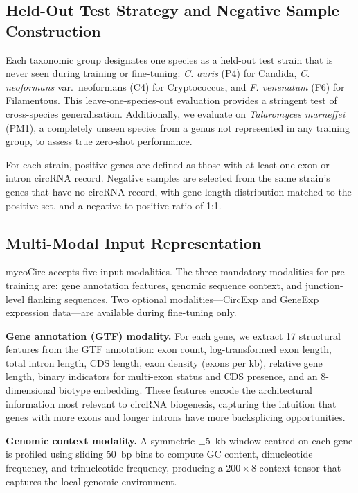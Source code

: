 \documentclass[12pt]{article}
\begin{document}
\subsection{Held-Out Test Strategy and Negative Sample Construction}

Each taxonomic group designates one species as a held-out test strain that is never seen during training or fine-tuning: \textit{C. auris} (P4) for Candida, \textit{C. neoformans} var.\ neoformans (C4) for Cryptococcus, and \textit{F. venenatum} (F6) for Filamentous. This leave-one-species-out evaluation provides a stringent test of cross-species generalisation. Additionally, we evaluate on \textit{Talaromyces marneffei} (PM1), a completely unseen species from a genus not represented in any training group, to assess true zero-shot performance.

For each strain, positive genes are defined as those with at least one exon or intron circRNA record. Negative samples are selected from the same strain's genes that have no circRNA record, with gene length distribution matched to the positive set, and a negative-to-positive ratio of 1:1.

\subsection{Multi-Modal Input Representation}

mycoCirc accepts five input modalities. The three mandatory modalities for pre-training are: gene annotation features, genomic sequence context, and junction-level flanking sequences. Two optional modalities---CircExp and GeneExp expression data---are available during fine-tuning only.

\textbf{Gene annotation (GTF) modality.} For each gene, we extract 17 structural features from the GTF annotation: exon count, log-transformed exon length, total intron length, CDS length, exon density (exons per kb), relative gene length, binary indicators for multi-exon status and CDS presence, and an 8-dimensional biotype embedding. These features encode the architectural information most relevant to circRNA biogenesis, capturing the intuition that genes with more exons and longer introns have more backsplicing opportunities.

\textbf{Genomic context modality.} A symmetric $\pm$5~kb window centred on each gene is profiled using sliding 50~bp bins to compute GC content, dinucleotide frequency, and trinucleotide frequency, producing a $200 \times 8$ context tensor that captures the local genomic environment.
\end{document}
